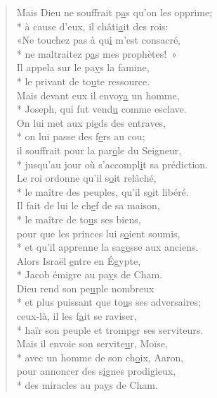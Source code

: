 \begin{verse}
Mais Dieu ne souffrait p\underline{a}s qu’on les opprime; \\*
à cause d’eux, il châti\underline{a}it des rois: \\
«Ne touchez pas à qu\underline{i} m’est consacré, \\*
ne maltraitez p\underline{a}s mes prophètes! » \\

Il appela sur le pa\underline{y}s la famine, \\*
le privant de to\underline{u}te ressource. \\
Mais devant eux il envoy\underline{a} un homme, \\*
Joseph, qui fut vend\underline{u} comme esclave. \\

On lui met aux pi\underline{e}ds des entraves, \\*
on lui passe des f\underline{e}rs au cou; \\
il souffrait pour la par\underline{o}le du Seigneur, \\*
jusqu’au jour où s’accompl\underline{i}t sa prédiction. \\

Le roi ordonne qu’il s\underline{o}it relâché, \\*
le maître des peuples, qu’il s\underline{o}it libéré. \\
Il fait de lui le ch\underline{e}f de sa maison, \\*
le maître de to\underline{u}s ses biens, \\
pour que les princes lui s\underline{o}ient soumis, \\*
et qu’il apprenne la sag\underline{e}sse aux anciens. \\

Alors Israël \underline{e}ntre en Égypte, \\*
Jacob émigre au pa\underline{y}s de Cham. \\
Dieu rend son pe\underline{u}ple nombreux \\*
et plus puissant que to\underline{u}s ses adversaires; \\
ceux-là, il les f\underline{a}it se raviser, \\*
haïr son peuple et tromp\underline{e}r ses serviteurs. \\

Mais il envoie son servite\underline{u}r, Moïse, \\*
avec un homme de son ch\underline{o}ix, Aaron, \\
pour annoncer des s\underline{i}gnes prodigieux, \\*
des miracles au pa\underline{y}s de Cham. \\


\end{verse}
